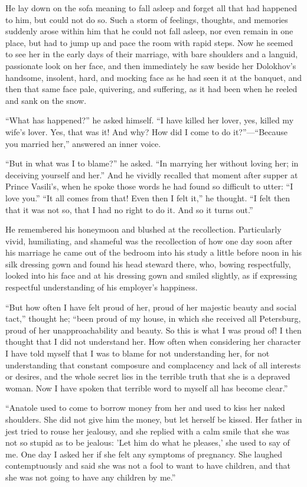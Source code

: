 He lay down on the sofa meaning to fall asleep and forget all
that had happened to him, but could not do so. Such a storm of
feelings, thoughts, and memories suddenly arose within him that
he could not fall asleep, nor even remain in one place, but had
to jump up and pace the room with rapid steps. Now he seemed to
see her in the early days of their marriage, with bare shoulders
and a languid, passionate look on her face, and then immediately
he saw beside her Dolokhov's handsome, insolent, hard, and
mocking face as he had seen it at the banquet, and then that same
face pale, quivering, and suffering, as it had been when he
reeled and sank on the snow.

``What has happened?'' he asked himself. ``I have killed her
lover, yes, killed my wife's lover. Yes, that was it! And why?
How did I come to do it?''---``Because you married her,''
answered an inner voice.

``But in what was I to blame?'' he asked. ``In marrying her
without loving her; in deceiving yourself and her.'' And he
vividly recalled that moment after supper at Prince Vasili's,
when he spoke those words he had found so difficult to utter: ``I
love you.'' ``It all comes from that! Even then I felt it,'' he
thought. ``I felt then that it was not so, that I had no right to
do it. And so it turns out.''

He remembered his honeymoon and blushed at the recollection.
Particularly vivid, humiliating, and shameful was the
recollection of how one day soon after his marriage he came out
of the bedroom into his study a little before noon in his silk
dressing gown and found his head steward there, who, bowing
respectfully, looked into his face and at his dressing gown and
smiled slightly, as if expressing respectful understanding of his
employer's happiness.

``But how often I have felt proud of her, proud of her majestic
beauty and social tact,'' thought he; ``been proud of my house,
in which she received all Petersburg, proud of her
unapproachability and beauty. So this is what I was proud of! I
then thought that I did not understand her. How often when
considering her character I have told myself that I was to blame
for not understanding her, for not understanding that constant
composure and complacency and lack of all interests or desires,
and the whole secret lies in the terrible truth that she is a
depraved woman. Now I have spoken that terrible word to myself
all has become clear.''

``Anatole used to come to borrow money from her and used to kiss
her naked shoulders. She did not give him the money, but let
herself be kissed. Her father in jest tried to rouse her
jealousy, and she replied with a calm smile that she was not so
stupid as to be jealous: 'Let him do what he pleases,' she used
to say of me. One day I asked her if she felt any symptoms of
pregnancy. She laughed contemptuously and said she was not a fool
to want to have children, and that she was not going to have any
children by me.''

